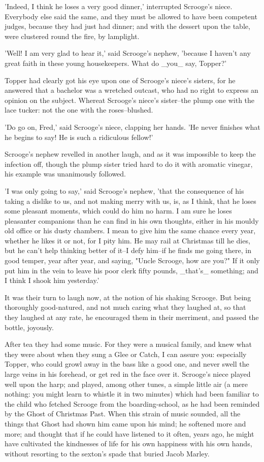 'Indeed, I think he loses a very good dinner,' interrupted Scrooge's
niece. Everybody else said the same, and they must be allowed to have
been competent judges, because they had just had dinner; and with the
dessert upon the table, were clustered round the fire, by lamplight.

'Well! I am very glad to hear it,' said Scrooge's nephew, 'because I
haven't any great faith in these young housekeepers. What do _you_ say,
Topper?'

Topper had clearly got his eye upon one of Scrooge's niece's sisters,
for he answered that a bachelor was a wretched outcast, who had no right
to express an opinion on the subject. Whereat Scrooge's niece's
sister--the plump one with the lace tucker: not the one with the
roses--blushed.

'Do go on, Fred,' said Scrooge's niece, clapping her hands. 'He never
finishes what he begins to say! He is such a ridiculous fellow!'

Scrooge's nephew revelled in another laugh, and as it was impossible to
keep the infection off, though the plump sister tried hard to do it with
aromatic vinegar, his example was unanimously followed.

'I was only going to say,' said Scrooge's nephew, 'that the consequence
of his taking a dislike to us, and not making merry with us, is, as I
think, that he loses some pleasant moments, which could do him no harm.
I am sure he loses pleasanter companions than he can find in his own
thoughts, either in his mouldy old office or his dusty chambers. I mean
to give him the same chance every year, whether he likes it or not, for
I pity him. He may rail at Christmas till he dies, but he can't help
thinking better of it--I defy him--if he finds me going there, in good
temper, year after year, and saying, "Uncle Scrooge, how are you?" If it
only put him in the vein to leave his poor clerk fifty pounds, _that's_
something; and I think I shook him yesterday.'

It was their turn to laugh now, at the notion of his shaking Scrooge.
But being thoroughly good-natured, and not much caring what they laughed
at, so that they laughed at any rate, he encouraged them in their
merriment, and passed the bottle, joyously.

After tea they had some music. For they were a musical family, and knew
what they were about when they sung a Glee or Catch, I can assure you:
especially Topper, who could growl away in the bass like a good one, and
never swell the large veins in his forehead, or get red in the face over
it. Scrooge's niece played well upon the harp; and played, among other
tunes, a simple little air (a mere nothing: you might learn to whistle
it in two minutes) which had been familiar to the child who fetched
Scrooge from the boarding-school, as he had been reminded by the Ghost
of Christmas Past. When this strain of music sounded, all the things
that Ghost had shown him came upon his mind; he softened more and more;
and thought that if he could have listened to it often, years ago, he
might have cultivated the kindnesses of life for his own happiness with
his own hands, without resorting to the sexton's spade that buried Jacob
Marley.

